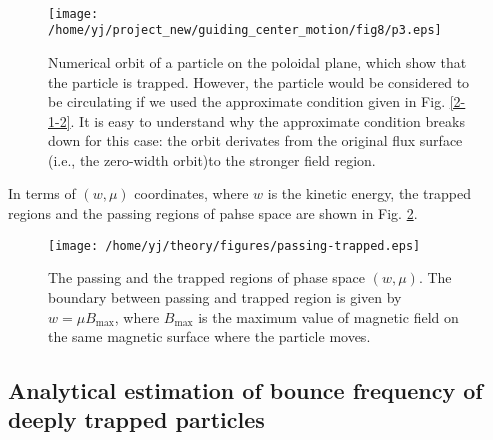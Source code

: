 \documentclass{article}
\begin{document}
\

\begin{figure}[h]
  \texttt{[image: /home/yj/project\_new/guiding\_center\_motion/fig8/p3.eps]}
  \caption{\label{6-12-a8}Numerical orbit of a particle on the poloidal plane,
  which show that the particle is trapped. However, the particle would be
  considered to be circulating if we used the approximate condition given in
  Fig. \ref{2-1-2}. It is easy to understand why the approximate condition
  breaks down for this case: the orbit derivates from the original flux
  surface (i.e., the zero-width orbit)to the stronger field region.}
\end{figure}

In terms of $(w, \mu)$ coordinates, where $w$ is the kinetic energy, the
trapped regions and the passing regions of pahse space are shown in Fig.
\ref{10-31-p1}.

\begin{figure}[h]
  \texttt{[image: /home/yj/theory/figures/passing-trapped.eps]}
  \caption{\label{10-31-p1}The passing and the trapped regions of phase space
  $(w, \mu)$. The boundary between passing and trapped region is given by $w =
  \mu B_{\max}$, where $B_{\max}$ is the maximum value of magnetic field on
  the same magnetic surface where the particle moves.}
\end{figure}

\subsection{Analytical estimation of bounce frequency of deeply trapped
particles}
\end{document}
